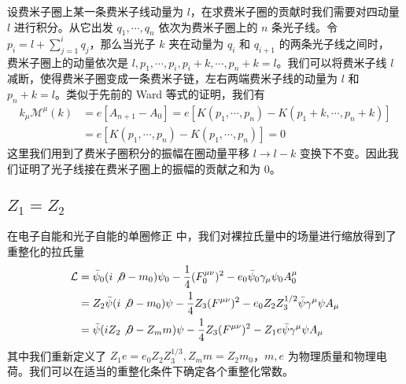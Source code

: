 设费米子圈上某一条费米子线动量为 $l$，在求费米子圈的贡献时我们需要对四动量 $l$ 进行积分。从它出发 $q_1,\cdots,q_n$ 依次为费米子圈上的 $n$ 条光子线。令 $p_i=l+\sum_{j=1}^i q_j$，那么当光子 $k$ 夹在动量为 $q_i$ 和 $q_{i+1}$ 的两条光子线之间时，
费米子圈上的动量依次是 $l,p_1,\cdots,p_i,
p_i+k,\cdots,p_n+k=l$。我们可以将费米子线 $l$ 减断，使得费米子圈变成一条费米子链，左右两端费米子线的动量为 $l$ 和 $p_n+k=l$。类似于先前的 Ward 等式的证明，我们有
\begin{equation}\label{eq_ward_4}
\begin{aligned}
k_\mu \mathcal{M}^\mu(k)&=e[A_{n+1}-A_0] =e[K(p_1,\cdots,p_n)-K(p_1+k,\cdots,p_n+k)]\\
&=e[K(p_1,\cdots,p_n)-K(p_1,\cdots,p_n)]=0
\end{aligned}
\end{equation}
这里我们用到了费米子圈积分的振幅在圈动量平移 $l\rightarrow l-k$ 变换下不变。因此我们证明了光子线接在费米子圈上的振幅的贡献之和为 $0$。

\subsection{$Z_1=Z_2$}
在电子自能和光子自能的单圈修正 中，我们对裸拉氏量中的场量进行缩放得到了重整化的拉氏量
\begin{equation}
\begin{aligned}
\mathcal{L} &= \bar{\psi}_0 (i\not\partial -m_0)\psi_0 -\frac{1}{4}(F_0^{\mu\nu})^2 - e_0\bar\psi_0 \gamma_\mu\psi_0 A_0^\mu
\\
&=Z_2\bar\psi (i\not\partial - m_0)\psi - \frac{1}{4}Z_3 (F^{\mu\nu})^2-e_0Z_2Z_3^{1/2} \bar\psi \gamma^\mu\psi A_\mu\\
&=\bar\psi (iZ_2\not\partial - Z_m m)\psi - \frac{1}{4}Z_3 (F^{\mu\nu})^2-Z_1 e \bar\psi \gamma^\mu\psi A_\mu
\end{aligned}
\end{equation}
其中我们重新定义了 $Z_1e=e_0 Z_2 Z_3^{1/3},Z_m m=Z_2 m_0$，$m,e$ 为物理质量和物理电荷。我们可以在适当的重整化条件下确定各个重整化常数。

